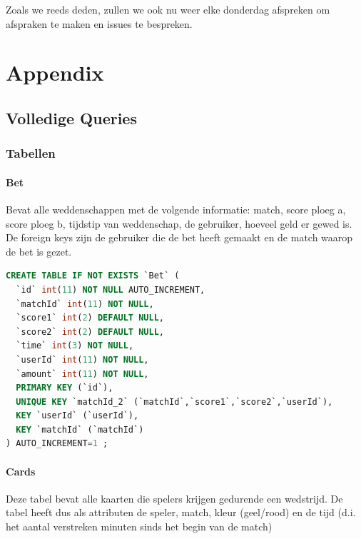 \documentclass[11pt]{article}
\begin{document}
Zoals we reeds deden, zullen we ook nu weer elke donderdag afspreken om afspraken te maken en issues te bespreken.



\section{Appendix}

\subsection{Volledige Queries}


\subsubsection{Tabellen}




    \paragraph{Bet}
        Bevat alle weddenschappen met de volgende informatie:
            match, score ploeg a, score ploeg b, tijdstip van weddenschap, de gebruiker,
            hoeveel geld er gewed is.
        De foreign keys zijn de gebruiker die de bet heeft gemaakt en de match waarop 
        de bet is gezet.
        
        \begin{framed}
        \begin{lstlisting}[language=sql]
CREATE TABLE IF NOT EXISTS `Bet` (
  `id` int(11) NOT NULL AUTO_INCREMENT,
  `matchId` int(11) NOT NULL,
  `score1` int(2) DEFAULT NULL,
  `score2` int(2) DEFAULT NULL,
  `time` int(3) NOT NULL,
  `userId` int(11) NOT NULL,
  `amount` int(11) NOT NULL,
  PRIMARY KEY (`id`),
  UNIQUE KEY `matchId_2` (`matchId`,`score1`,`score2`,`userId`),
  KEY `userId` (`userId`),
  KEY `matchId` (`matchId`)
) AUTO_INCREMENT=1 ;
        \end{lstlisting}
        \end{framed}

    \paragraph{Cards}
    
        Deze tabel bevat alle kaarten die spelers krijgen gedurende een wedstrijd.
        De tabel heeft dus als attributen de speler, match, kleur (geel/rood) en de tijd (d.i. het aantal verstreken minuten sinds het begin van de match)
    
\end{document}
